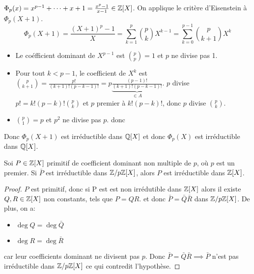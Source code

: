 \begin{example}
	$\Phi_p(x) = x^{p-1} + \cdots + x + 1  = \frac{x^p - 1}{x-1} \in \mathbb{Z}[X]$.
	On applique le critère d'Eisenstein à $\Phi_p(X+1)$.
	$$ \Phi_p(X+1) = \frac{(X+1)^p - 1}{X} = \sum_{k=1}^p \binom{p}{k} X^{k-1} = \sum_{k=0}^{p-1} \binom{p}{k+1} X^k$$
	\begin{itemize}
		\item Le coéfficient dominant de $X^{p-1}$ est $\binom{p}{p} = 1$ et $p$ ne divise pas 1.
		\item Pour tout $k < p-1$, le coefficient de $X^k$ est $\binom{p}{k+1} = \frac{p!}{(k+1)!(p-k-1)!} = p \underbrace{\frac{(p-1)!}{(k+1)!(p-k-1)!}}_{\in A}$.
		      $p$ divise $p! = k!(p-k)!\binom{p}{k}$ et $p$ premier à $k!(p-k)!$, donc $p$ divise $\binom{p}{k}$.
		\item $\binom{p}{1} = p$ et $p^2$ ne divise pas $p$. donc
	\end{itemize}
	Donc $\Phi_p(X+1)$ est irréductible dans $\mathbb{Q}[X]$ et donc $\Phi_p(X)$ est irréductible dans $\mathbb{Q}[X]$.
\end{example}


\begin{prop}
	Soi $P \in \mathbb{Z}[X]$ primitif de coefficient dominant non multiple de $p$, où $p$ est un premier.
	Si $\bar{P}$ est irréductible dans  $\mathbb{Z}/p\mathbb{Z}[X]$, alors $P$ est irréductible dans $\mathbb{Z}[X]$.
\end{prop}

\begin{proof}
    $P$ est primitif, donc si P est est non irrédutible dans $\mathbb{Z}[X]$ alors il existe $Q, R \in \mathbb{Z}[X]$ non constants, tels que $P = QR$.
	et donc $\bar{P} = \bar{Q}\bar{R}$ dans $\mathbb{Z}/p\mathbb{Z}[X]$.
	De plus, on a:
	\begin{itemize}
		\item $\deg Q = \deg \bar{Q}$
		\item $\deg R = \deg \bar{R}$

	\end{itemize}
	car leur coefficients dominant ne divisent pas $p$.
	Donc $\bar{P} = \bar{Q}\bar{R} \implies \bar{P}$ n'est pas irréductible dans $\mathbb{Z}/p\mathbb{Z}[X]$ ce qui contredit l'hypothèse.
\end{proof}
